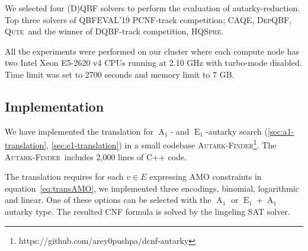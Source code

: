 \documentclass[runningheads]{llncs}
\DeclareMathOperator{\Aaut}{A}
\DeclareMathOperator{\Eaut}{E}
\newcommand{\caqe}{\textsc{CAQE}}
\newcommand{\depqbf}{\textsc{DepQBF}}
\newcommand{\qute}{\textsc{Qute}}
\newcommand{\hqspre}{\textsc{HQSpre}}
\newcommand{\autfinder}{\textsc{Autark-Finder}}
\begin{document}
We selected four (D)QBF solvers to perform the evaluation of autarky-reduction. Top three solvers of QBFEVAL'19 PCNF-track competition; \caqe \cite{DBLP:conf/fmcad/RabeT15}, \depqbf \cite{DBLP:conf/cade/LonsingE17}, \qute \cite{DBLP:journals/jsat/PeitlSS19}\ and the winner of DQBF-track competition, \hqspre \cite{DBLP:conf/tacas/WimmerRM017}.

All the experiments were performed on our cluster where each compute node has
two Intel Xeon E5-2620 v4 CPUs running at 2.10 GHz with turbo-mode disabled.
Time limit was set to 2700 seconds and memory limit to 7 GB.

\subsection{Implementation}
We have implemented the translation for $\Aaut_1$- and $\Eaut_1$-autarky search  (\ref{sec:a1-translation}, \ref{sec:e1-translation}) in a small codebase \autfinder\footnote{https://github.com/arey0pushpa/dcnf-autarky}. The \autfinder\ includes 2,000 lines of C++ code.

The translation requires for each $v \in E$ expressing AMO constraints in equation~\ref{eq:transAMO}, we implemented three encodings, binomial, logarithmic and linear. One of these options can be selected with the $\Aaut_1$ or $\Eaut_1+\Aaut_1$ autarky type. The resulted CNF formula is solved by the lingeling \cite{Biere-SAT-Competition-2017-solvers} SAT solver.
\end{document}
